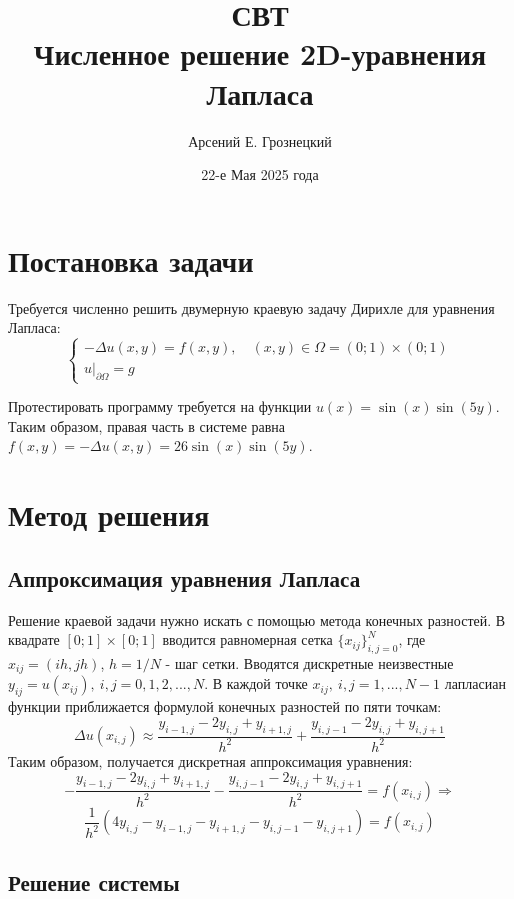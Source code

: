 \documentclass{article}
\title{\textbf{СВТ}\\ \textbf{Численное решение 2D-уравнения Лапласа} }
\author{Арсений Е. Грознецкий}
\date{22-е Мая 2025 года}
\begin{document}
\maketitle
\tableofcontents

\newpage
\section{Постановка задачи}

Требуется численно решить двумерную краевую задачу Дирихле для уравнения Лапласа:
$$
\begin{cases}
-\Delta u(x, y) = f(x, y), \quad (x, y) \in \Omega = (0; 1)\times(0; 1) \\
u\vert_{\partial \Omega} = g
\end{cases}
$$

Протестировать программу требуется на функции $u(x) = \sin (x) \sin (5y)$. Таким образом, правая часть в системе равна $f(x, y) = -\Delta u(x, y) = 26 \sin (x) \sin (5y)$.

\section{Метод решения}

\subsection*{Аппроксимация уравнения Лапласа}

Решение краевой задачи нужно искать с помощью метода конечных разностей. 
В квадрате $[0; 1]\times[0; 1]$ вводится равномерная сетка $\{x_{ij}\}_{i, j = 0}^N$, где $x_{ij} = (ih, jh)$, $h = 1 / N$ - шаг сетки. Вводятся дискретные неизвестные $y_{ij} = u(x_{ij}), \ i,j = 0, 1, 2, ... , N$. В каждой точке $x_{ij}, \ i, j = 1, ... , N - 1$ лапласиан функции приближается формулой конечных разностей по пяти точкам:
$$
\Delta u(x_{i,j}) \approx \frac{y_{i - 1, j} - 2y_{i, j} + y_{i + 1, j}}{h^2} + \frac{y_{i, j - 1} - 2y_{i, j} + y_{i, j + 1}}{h^2}
$$
Таким образом, получается дискретная аппроксимация уравнения:
$$
-\frac{y_{i - 1, j} - 2y_{i, j} + y_{i + 1, j}}{h^2} - \frac{y_{i, j - 1} - 2y_{i, j} + y_{i, j + 1}}{h^2} = f(x_{i, j})
\Longrightarrow
$$
$$\frac{1}{h^2} \left ( 4y_{i,j} - y_{i - 1, j} - y_{i+1, j} - y_{i, j-1} - y_{i, j+1}\right ) = f(x_{i,j})$$

\subsection*{Решение системы}
\end{document}
